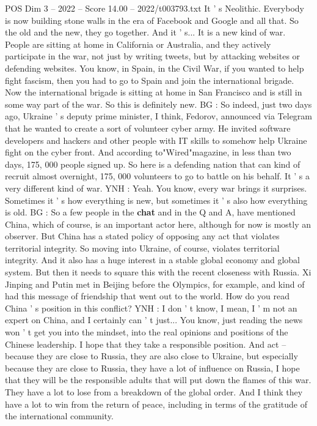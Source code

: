 \begin{textsample}{POS Dim 3 – 2022 – Score 14.00 – 2022/t003793.txt}
It ' s Neolithic.
Everybody is now building stone walls in the era of Facebook and Google and all that.
So the old and the new, they go together.
And it ' s...
It is a new kind of war.
People are sitting at home in California or Australia, and they actively participate in the war, not just by writing tweets, but by attacking websites or defending websites.
You know, in Spain, in the Civil War, if you wanted to help fight fascism, then you had to go to Spain and join the international brigade.
Now the international brigade is sitting at home in San Francisco and is still in some way part of the war.
So this is definitely new.
BG : So indeed, just two days ago, Ukraine ' s deputy prime minister, I think, Fedorov, announced via Telegram that he wanted to create a sort of volunteer cyber army.
He invited software developers and hackers and other people with IT skills to somehow help Ukraine fight on the cyber front.
And according to"Wired"magazine, in less than two days, 175, 000 people signed up.
So here is a defending nation that can kind of recruit almost overnight, 175, 000 volunteers to go to battle on his behalf.
It ' s a very different kind of war.
YNH : Yeah.
You know, every war brings it surprises.
Sometimes it ' s how everything is new, but sometimes it ' s also how everything is old.
BG : So a few people in the \textbf{chat} and in the Q and A, have mentioned China, which of course, is an important actor here, although for now is mostly an observer.
But China has a stated policy of opposing any act that violates territorial integrity.
So moving into Ukraine, of course, violates territorial integrity.
And it also has a huge interest in a stable global economy and global system.
But then it needs to square this with the recent closeness with Russia.
Xi Jinping and Putin met in Beijing before the Olympics, for example, and kind of had this message of friendship that went out to the world.
How do you read China ' s position in this conflict?
YNH : I don ' t know, I mean, I ' m not an expert on China, and I certainly can ' t just...
You know, just reading the news won ' t get you into the mindset, into the real opinions and positions of the Chinese leadership.
I hope that they take a responsible position.
And act -- because they are close to Russia, they are also close to Ukraine, but especially because they are close to Russia, they have a lot of influence on Russia, I hope that they will be the responsible adults that will put down the flames of this war.
They have a lot to lose from a breakdown of the global order.
And I think they have a lot to win from the return of peace, including in terms of the gratitude of the international community.

\end{textsample}
